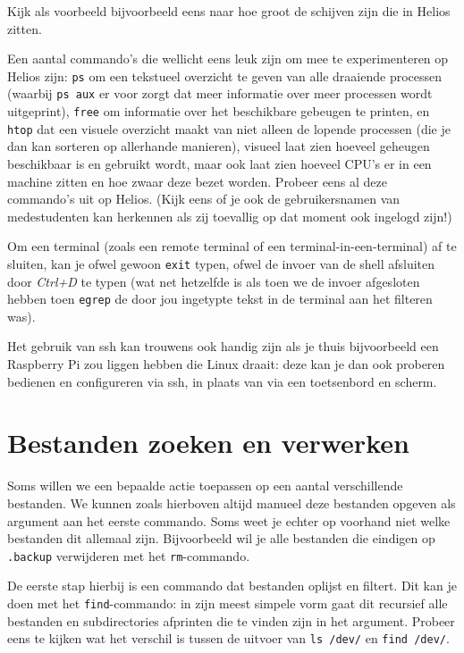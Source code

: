 \documentclass[a4paper,twoside,openany]{memoir}
\begin{document}
Kijk als voorbeeld bijvoorbeeld eens naar hoe groot de schijven zijn die in
Helios zitten.

Een aantal commando's die wellicht eens leuk zijn om mee te experimenteren op
Helios zijn: \verb!ps! om een tekstueel overzicht te geven van alle draaiende
processen (waarbij \verb!ps aux! er voor zorgt dat meer informatie over meer
processen wordt uitgeprint), \verb!free! om informatie over het beschikbare
gebeugen te printen, en \verb!htop! dat een visuele overzicht maakt van niet
alleen de lopende processen (die je dan kan sorteren op allerhande manieren),
visueel laat zien hoeveel geheugen beschikbaar is en gebruikt wordt, maar ook
laat zien hoeveel CPU's er in een machine zitten en hoe zwaar deze bezet
worden. Probeer eens al deze commando's uit op Helios. (Kijk eens of je ook de
gebruikersnamen van medestudenten kan herkennen als zij toevallig op dat moment
ook ingelogd zijn!)

Om een terminal (zoals een remote terminal of een terminal-in-een-terminal) af
te sluiten, kan je ofwel gewoon \verb!exit! typen, ofwel de invoer van de shell
afsluiten door \emph{Ctrl+D} te typen (wat net hetzelfde is als toen we de
invoer afgesloten hebben toen \verb!egrep! de door jou ingetypte tekst in de
terminal aan het filteren was).

Het gebruik van ssh kan trouwens ook handig zijn als je thuis bijvoorbeeld een
Raspberry Pi zou liggen hebben die Linux draait: deze kan je dan ook proberen
bedienen en configureren via ssh, in plaats van via een toetsenbord en scherm.

\chapter{Bestanden zoeken en verwerken}

Soms willen we een bepaalde actie toepassen op een aantal verschillende
bestanden. We kunnen zoals hierboven altijd manueel deze bestanden opgeven als
argument aan het eerste commando. Soms weet je echter op voorhand niet welke
bestanden dit allemaal zijn. Bijvoorbeeld wil je alle bestanden die eindigen op
\verb!.backup! verwijderen met het \verb!rm!-commando.

De eerste stap hierbij is een commando dat bestanden oplijst en filtert. Dit
kan je doen met het \verb!find!-commando: in zijn meest simpele vorm gaat dit
recursief alle bestanden en subdirectories afprinten die te vinden zijn in het
argument. Probeer eens te kijken wat het verschil is tussen de uitvoer van
\verb!ls /dev/! en \verb!find /dev/!.
\end{document}
